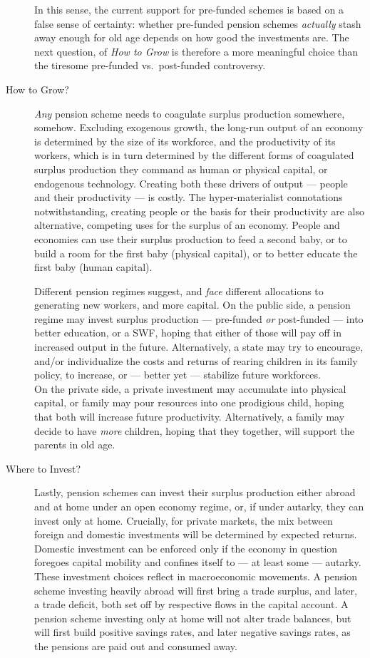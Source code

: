 \begin{description}
{		In this sense, the current support for pre-funded schemes is based on a false sense of certainty:
		whether pre-funded pension schemes \emph{actually} stash away enough for old age depends on how good the investments are.
		The next question, of \emph{How to Grow} is therefore a more meaningful choice than the tiresome pre-funded vs.\ post-funded controversy.
	}
	\item[How to Grow?]
	\emph{Any} pension scheme needs to coagulate surplus production somewhere, somehow.
	Excluding exogenous growth, the long-run output of an economy is determined by the size of its workforce, and the productivity of its workers, which is in turn determined by the different forms of coagulated surplus production they command as human or physical capital, or endogenous technology.
	Creating both these drivers of output --- people and their productivity --- is costly.
	The hyper-materialist connotations notwithstanding, creating people or the basis for their productivity are also alternative, competing uses for the surplus of an economy.
	People and economies can use their surplus production to feed a second baby, or to build a room for the first baby (physical capital), or to better educate the first baby (human capital).

	Different pension regimes suggest, and \emph{face} different allocations to generating new workers, and more capital.
	On the public side, a pension regime may invest surplus production --- pre-funded \emph{or} post-funded --- into better education, or a \gls{SWF}, hoping that either of those will pay off in increased output in the future.
Alternatively, a state may try to encourage, and/or individualize the costs and returns of rearing children in its family policy, to increase, or --- better yet --- stabilize future workforces.
\\
	On the private side, a private investment may accumulate into physical capital, or family may pour resources into one prodigious child, hoping that both will increase future productivity.
Alternatively, a family may decide to have \emph{more} children, hoping that they together, will support the parents in old age.

	\item[Where to Invest?] Lastly, pension schemes can invest their surplus production either abroad and at home under an open economy regime, or, if under autarky, they can invest only at home.
Crucially, for private markets, the mix between foreign and domestic investments will be determined by expected returns.
Domestic investment can be enforced only if the economy in question foregoes capital mobility and confines itself to --- at least some --- autarky.
\\
	These investment choices reflect in macroeconomic movements.
A pension scheme investing heavily abroad will first bring a trade surplus, and later, a trade deficit, both set off by respective flows in the capital account.
A pension scheme investing only at home will not alter trade balances, but will first build positive savings rates, and later negative savings rates, as the pensions are paid out and consumed away.
\end{description}

